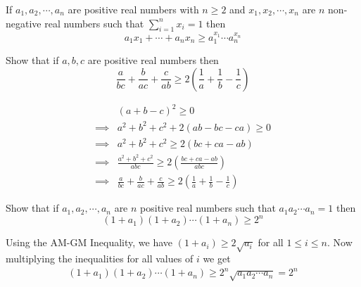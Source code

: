 \begin{theorem}
    If $a_{1}, a_{2}, \cdots, a_{n}$ are positive real numbers with $n\geq 2$ and 
    $x_{1}, x_{2}, \cdots, x_{n}$ are $n$ non-negative real numbers such that 
    $\sum_{i=1}^{n} x_{i}=1$ then 
    \[
        a_{1}x_{1} + \cdots + a_{n}x_{n} \geq a_{1}^{x_{1}} \cdots a_{n}^{x_{n}}
    \]
\end{theorem}

\begin{problem}[BDMO 2019]
    Show that if $a,b,c$ are positive real numbers then
    \[
        \frac{a}{bc} + \frac{b}{ac} + \frac{c}{ab} \geq 2\left(\frac{1}{a} + \frac{1}{b} - \frac{1}{c}\right)
    \]
\end{problem}
\begin{sol}
    \begin{align*}
                 & (a+b-c)^{2} \geq 0 \\
        \implies & a^{2} + b^{2} + c^{2} + 2(ab - bc - ca) \geq 0 \\
        \implies & a^{2} + b^{2} + c^{2} \geq 2(bc + ca - ab) \\
        \implies & \frac{a^{2} + b^{2} + c^{2}}{abc} \geq 2\left(\frac{bc+ ca - ab}{abc}\right) \\
        \implies & \frac{a}{bc} + \frac{b}{ac} + \frac{c}{ab} \geq 2\left(\frac{1}{a} + \frac{1}{b} - \frac{1}{c}\right)
    \end{align*}
\end{sol}

\begin{problem}
    Show that if $a_{1}, a_{2}, \cdots, a_{n}$ are $n$ positive real numbers 
    such that $a_{1}a_{2}\cdots a_{n} = 1$ then
    \[
        (1+a_{1})(1+a_{2})\cdots (1+a_{n}) \geq 2^{n}
    \]
\end{problem}
\begin{sol}
    Using the AM-GM Inequality, we have 
    $(1 + a_{i}) \geq 2\sqrt{a_{i}}$ for all $1\leq i \leq n$. 
    Now multiplying the inequalities for all values of $i$ we get
    \begin{align*}
        (1+a_{1})(1+a_{2})\cdots (1+a_{n}) \geq 2^{n} \sqrt{a_{1}a_{2}\cdots a_{n}} = 2^{n}
    \end{align*}
\end{sol}

